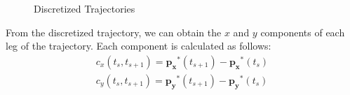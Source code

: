 \documentclass[letterpaper, 10 pt, conference]{ieeeconf}  %
\begin{document}
\begin{figure}[h]
	\centering
	\caption{Discretized Trajectories}
	\label{fig:trajs}
\end{figure}

From the discretized trajectory, we can obtain the $x$ and $y$ components of each leg of the trajectory. Each component is calculated as follows:
\begin{align}
    c_{x}(t_s,t_{s+1}) = \mathbf{p_x}^*(t_{s+1}) - \mathbf{p_x}^*(t_{s}) \nonumber \\
    c_{y}(t_s,t_{s+1}) = \mathbf{p_y}^*(t_{s+1}) - \mathbf{p_y}^*(t_{s})
\end{align}
\end{document}
